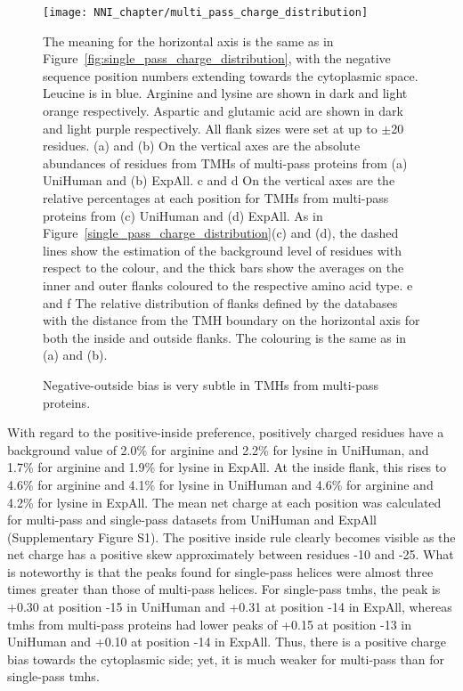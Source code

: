 \begin{figure}[!p]
\centering
\texttt{[image: NNI\_chapter/multi\_pass\_charge\_distribution]}
\caption{Negative-outside bias is very subtle in TMHs from multi-pass proteins.}

\medskip
\small
The meaning for the horizontal axis is the same as in Figure~\ref{fig:single_pass_charge_distribution}, with the negative sequence position numbers extending towards the cytoplasmic space. Leucine is in blue. Arginine and lysine are shown in dark and light orange respectively. Aspartic and glutamic acid are shown in dark and light purple respectively. All flank sizes were set at up to $\pm$20 residues. (a) and (b) On the vertical axes are the absolute abundances of residues from TMHs of multi-pass proteins from (a) UniHuman and (b) ExpAll. c and d On the vertical axes are the relative percentages at each position for TMHs from multi-pass proteins from (c) UniHuman and (d) ExpAll. As in Figure~\ref{single_pass_charge_distribution}(c) and (d), the dashed lines show the estimation of the background level of residues with respect to the colour, and the thick bars show the averages on the inner and outer flanks coloured to the respective amino acid type. e and f The relative distribution of flanks defined by the databases with the distance from the TMH boundary on the horizontal axis for both the inside and outside flanks. The colouring is the same as in (a) and (b).
\label{fig:multi_pass_charge_distribution}
\end{figure}

With regard to the positive-inside preference, positively charged residues have a background value of 2.0\% for arginine and 2.2\% for lysine in UniHuman, and 1.7\% for arginine and 1.9\% for lysine in ExpAll. At the inside flank, this rises to 4.6\% for arginine and 4.1\% for lysine in UniHuman and 4.6\% for arginine and 4.2\% for lysine in ExpAll. The mean net charge at each position was calculated for multi-pass and single-pass datasets from UniHuman and ExpAll (Supplementary Figure S1). The positive inside rule clearly becomes visible as the net charge has a positive skew approximately between residues -10 and -25. What is noteworthy is that the peaks found for single-pass helices were almost three times greater than those of multi-pass helices. For single-pass \gls{tmh}s, the peak is +0.30 at position -15 in UniHuman and +0.31 at position -14 in ExpAll, whereas \gls{tmh}s from multi-pass proteins had lower peaks of +0.15 at position -13 in UniHuman and +0.10 at position -14 in ExpAll. Thus, there is a positive charge bias towards the cytoplasmic side; yet, it is much weaker for multi-pass than for single-pass \gls{tmh}s.

